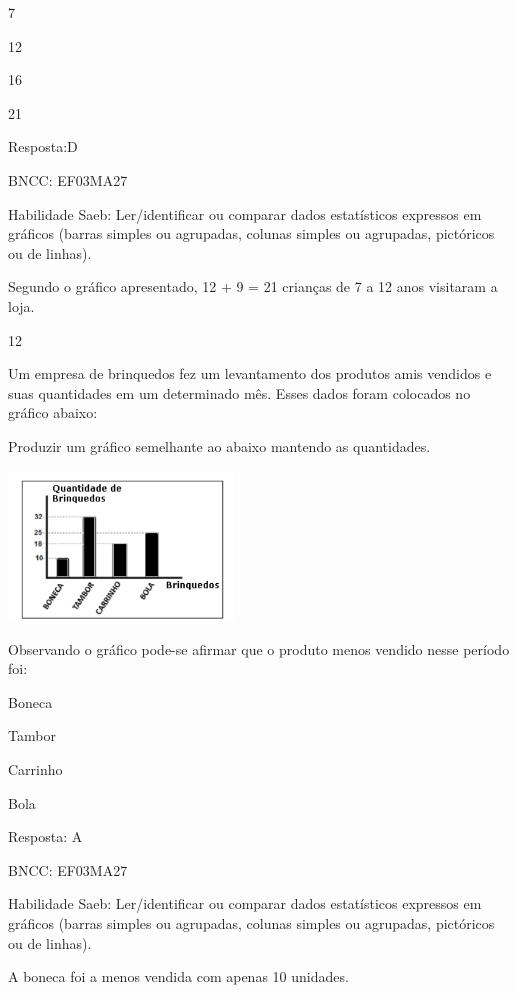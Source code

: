 \begin{escolha}
{\begin{escolha}
{\begin{escolha}

\item
  7
\item
  12
\item
  16
\item
  21
\end{escolha}

Resposta:D

BNCC: EF03MA27

Habilidade Saeb: Ler/identificar ou comparar dados estatísticos
expressos em gráficos (barras simples ou agrupadas, colunas simples ou
agrupadas, pictóricos ou de linhas).

Segundo o gráfico apresentado, 12 + 9 = 21 crianças de 7 a 12 anos
visitaram a loja.

\num{12}

Um empresa de brinquedos fez um levantamento dos produtos amis vendidos
e suas quantidades em um determinado mês. Esses dados foram colocados no
gráfico abaixo:

Produzir um gráfico semelhante ao abaixo mantendo as quantidades.

\includegraphics[width=2.35294in,height=1.56863in]{media/image137.png}

Observando o gráfico pode-se afirmar que o produto menos vendido nesse
período foi:

\begin{escolha}

\item
  Boneca
\item
  Tambor
\item
  Carrinho
\item
  Bola
\end{escolha}

Resposta: A

BNCC: EF03MA27

Habilidade Saeb: Ler/identificar ou comparar dados estatísticos
expressos em gráficos (barras simples ou agrupadas, colunas simples ou
agrupadas, pictóricos ou de linhas).

A boneca foi a menos vendida com apenas 10 unidades.

}
\end{escolha}}
\end{escolha}
